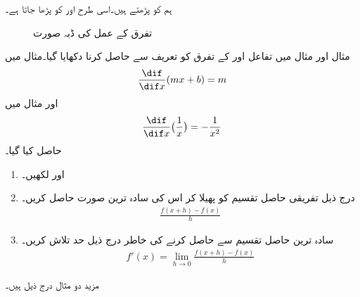 ہم  کو  پڑھتے ہیں۔اسی طرح  اور  کو  پڑھا جاتا ہے۔
\begin{figure}
\centering
{}
\caption{تفرق کے عمل کی ڈبہ صورت}
\label{شکل_تفرق_ڈبہ_صورت}
\end{figure}

مثال  اور مثال  میں تفاعل  اور  کے تفرق کو تعریف سے حاصل کرنا دکھایا گیا۔مثال  میں 
\begin{align*}
\frac{\dif}{\dif x}(mx+b)=m
\end{align*}
اور   مثال  میں
\begin{align}
\frac{\dif}{\dif x}\big(\frac{1}{x}\big)=-\frac{1}{x^2}
\end{align}
حاصل کیا گیا۔

\begin{enumerate}[1.]

\item
{} اور  لکھیں۔
\item
درج ذیل تفریقی حاصل تقسیم کو پھیلا کر اس کی سادہ ترین صورت حاصل کریں۔
\begin{align*}
\frac{f(x+h)-f(x)}{h}
\end{align*}
\item
سادہ ترین حاصل تقسیم سے  حاصل کرنے کی خاطر درج ذیل حد تلاش کریں۔
\begin{align*}
f'(x)=\lim_{h\to 0}\frac{f(x+h)-f(x)}{h}
\end{align*}
\end{enumerate}

مزید دو مثال درج ذیل ہیں۔

